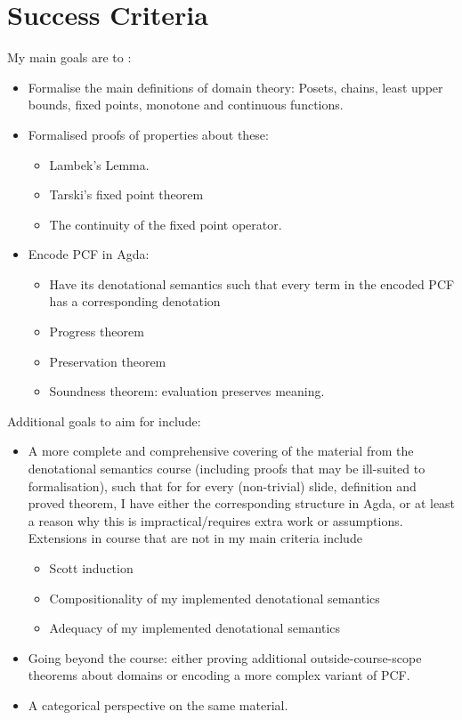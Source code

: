 \documentclass{article}
\begin{document}
\section{Success Criteria}
My main goals are to :
\begin{itemize}
\item
Formalise the main definitions of domain theory: Posets, chains, least upper bounds, fixed points, monotone and continuous functions. 
\item
Formalised proofs of properties about these: 
\begin{itemize}
\item
Lambek's Lemma.
\item
Tarski's fixed point theorem
\item
The continuity of the fixed point operator. 
\end{itemize}
\item
Encode PCF in Agda:
\begin{itemize}
\item
Have its denotational semantics such that every term in the encoded PCF has a corresponding denotation
\item
Progress theorem
\item
Preservation theorem
\item
Soundness theorem: evaluation preserves meaning.
\end{itemize}
\end{itemize}
Additional goals to aim for include:
\begin{itemize}
\item
A more complete and comprehensive covering of the material from the denotational semantics course (including proofs that may be ill-suited to formalisation), such that for for every (non-trivial) slide, definition and proved theorem, I have either the corresponding structure in Agda, or at least a reason why this is impractical/requires extra work or assumptions. Extensions in course that are not in my main criteria include
\begin{itemize}
\item Scott induction
\item Compositionality of my implemented denotational semantics
\item Adequacy of my implemented denotational semantics
\end{itemize}
\item
Going beyond the course: either proving additional outside-course-scope theorems about domains or encoding a more complex variant of PCF.
\item
A categorical perspective on the same material. 
\end{itemize}
\end{document}
